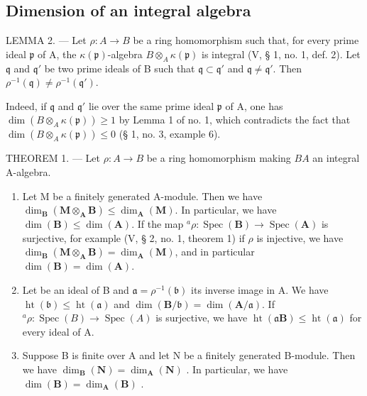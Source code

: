 \subsection{Dimension of an integral algebra}

LEMMA 2. --- Let \(\rho: A \to B\) be a ring homomorphism such that, for every prime ideal \(\mathfrak{p}\) of A, the \(\kappa(\mathfrak{p})\)-algebra \(B \otimes_{A} \kappa(\mathfrak{p})\) is integral (V, § 1, no. 1, def. 2). Let \(\mathfrak{q}\) and \(\mathfrak{q}'\) be two prime ideals of B such that \(\mathfrak{q} \subset \mathfrak{q}'\) and \(\mathfrak{q} \neq \mathfrak{q}'\). Then \(\rho^{-1}(\mathfrak{q}) \neq \rho^{-1}(\mathfrak{q}')\).

Indeed, if \(\mathfrak{q}\) and \(\mathfrak{q}'\) lie over the same prime ideal \(\mathfrak{p}\) of A, one has \(\dim(B \otimes_{A} \kappa(\mathfrak{p})) \geqslant 1\) by Lemma 1 of no. 1, which contradicts the fact that \(\dim(B \otimes_{A} \kappa(\mathfrak{p})) \leqslant 0\) (§ 1, no. 3, example 6).

THEOREM 1. --- Let \(\rho: A \to B\) be a ring homomorphism making \(B\)\(A\) an integral A-algebra.

\begin{enumerate}
\def\labelenumi{\alph{enumi})}
\item
  Let M be a finitely generated A-module. Then we have \(\dim_{\mathbf{B}}(\mathbf{M} \otimes_{\mathbf{A}} \mathbf{B}) \leqslant \dim_{\mathbf{A}}(\mathbf{M})\). In particular, we have \(\dim(\mathbf{B}) \leqslant \dim(\mathbf{A})\). If the map \({}^{a}\rho: \operatorname{Spec}(\mathbf{B}) \to \operatorname{Spec}(\mathbf{A})\) is surjective, for example (V, § 2, no. 1, theorem 1) if \(\rho\) is injective, we have \(\dim_{\mathbf{B}}(\mathbf{M} \otimes_{\mathbf{A}} \mathbf{B}) = \dim_{\mathbf{A}}(\mathbf{M})\), and in particular \(\dim(\mathbf{B}) = \dim(\mathbf{A})\).
\item
  Let  be an ideal of B and \(\mathfrak{a} = \rho^{-1}(\mathfrak{b})\) its inverse image in A. We have \(\operatorname{ht}(\mathfrak{b}) \leqslant \operatorname{ht}(\mathfrak{a})\) and \(\dim(\mathbf{B}/\mathfrak{b}) = \dim(\mathbf{A}/\mathfrak{a})\). If \({}^{a}\rho : \operatorname{Spec}(B) \to \operatorname{Spec}(A)\) is surjective, we have \(\operatorname{ht}(\mathfrak{a}\mathbf{B}) \leqslant \operatorname{ht}(\mathfrak{a})\) for every ideal  of A.
\item
  Suppose B is finite over A and let N be a finitely generated B-module. Then we have \(\dim_{\mathbf{B}}(\mathbf{N}) = \dim_{\mathbf{A}}(\mathbf{N})\) . In particular, we have \(\dim(\mathbf{B}) = \dim_{\mathbf{A}}(\mathbf{B})\) .
\end{enumerate}

